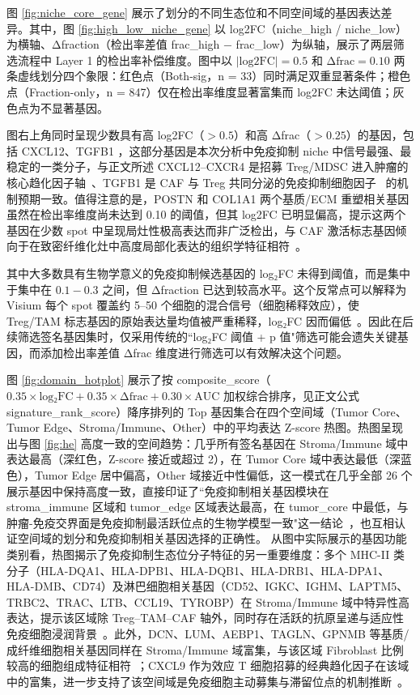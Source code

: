 \documentclass[12pt, a4paper]{ctexart}
\begin{document}
图 \ref{fig:niche_core_gene} 展示了划分的不同生态位和不同空间域的基因表达差异。其中，图 \ref{fig:high_low_niche_gene} 以 log2FC（niche\_high / niche\_low）为横轴、Δfraction（检出率差值 frac\_high − frac\_low）为纵轴，展示了两层筛选流程中 Layer 1 的检出率补偿维度。图中以 $|\text{log2FC}| = 0.5$ 和 $\text{Δfrac} = 0.10$ 两条虚线划分四个象限：红色点（Both-sig，n = 33）同时满足双重显著条件；橙色点（Fraction-only，n = 847）仅在检出率维度显著富集而 log2FC 未达阈值；灰色点为不显著基因。

图右上角同时呈现少数具有高 log2FC（$> 0.5$）和高 Δfrac（$> 0.25$）的基因，包括 CXCL12、TGFB1 ，这部分基因是本次分析中免疫抑制 niche 中信号最强、最稳定的一类分子，与正文所述 CXCL12--CXCR4 是招募 Treg/MDSC 进入肿瘤的核心趋化因子轴~\citep{domanska2013targeting}、TGFB1 是 CAF 与 Treg 共同分泌的免疫抑制细胞因子~\citep{mariathasan2018tgfb} 的机制预期一致。值得注意的是，POSTN 和 COL1A1 两个基质/ECM 重塑相关基因虽然在检出率维度尚未达到 0.10 的阈值，但其 log2FC 已明显偏高，提示这两个基因在少数 spot 中呈现局灶性极高表达而非广泛检出，与 CAF 激活标志基因倾向于在致密纤维化灶中高度局部化表达的组织学特征相符~\citep{kalluri2016biology,iozzo2015proteoglycan}。

其中大多数具有生物学意义的免疫抑制候选基因的 log₂FC 未得到阈值，而是集中于集中在 $0.1-0.3$ 之间，但 Δfraction 已达到较高水平。这个反常点可以解释为 Visium 每个 spot 覆盖约 5--50 个细胞的混合信号（细胞稀释效应），使 Treg/TAM 标志基因的原始表达量均值被严重稀释，log₂FC 因而偏低~\citep{luecken2019current}。因此在后续筛选签名基因集时，仅采用传统的``log₂FC 阈值 + p 值"筛选可能会遗失关键基因，而添加检出率差值 Δfrac 维度进行筛选可以有效解决这个问题。

图 \ref{fig:domain_hotplot} 展示了按 composite\_score（$0.35 \times \text{log₂FC} + 0.35 \times \text{Δfrac} + 0.30 \times \text{AUC}$ 加权综合排序，见正文公式 signature\_rank\_score）降序排列的 Top 基因集合在四个空间域（Tumor Core、Tumor Edge、Stroma/Immune、Other）中的平均表达 Z-score 热图。热图呈现出与图 \ref{fig:he} 高度一致的空间趋势：几乎所有签名基因在 Stroma/Immune 域中表达最高（深红色，Z-score 接近或超过 2），在 Tumor Core 域中表达最低（深蓝色），Tumor Edge 居中偏高，Other 域接近中性偏低，这一模式在几乎全部 26 个展示基因中保持高度一致，直接印证了``免疫抑制相关基因模块在 stroma\_immune 区域和 tumor\_edge 区域表达最高，在 tumor\_core 中最低，与肿瘤-免疫交界面是免疫抑制最活跃位点的生物学模型一致"这一结论~\citep{zheng2017landscape}，也互相认证空间域的划分和免疫抑制相关基因选择的正确性。
从图中实际展示的基因功能类别看，热图揭示了免疫抑制生态位分子特征的另一重要维度：多个 MHC-II 类分子（HLA-DQA1、HLA-DPB1、HLA-DQB1、HLA-DRB1、HLA-DPA1、HLA-DMB、CD74）及淋巴细胞相关基因（CD52、IGKC、IGHM、LAPTM5、TRBC2、TRAC、LTB、CCL19、TYROBP）在 Stroma/Immune 域中特异性高表达，提示该区域除 Treg--TAM--CAF 轴外，同时存在活跃的抗原呈递与适应性免疫细胞浸润背景~\citep{neefjes2011towards,chen2017oncology}。此外，DCN、LUM、AEBP1、TAGLN、GPNMB 等基质/成纤维细胞相关基因同样在 Stroma/Immune 域富集，与该区域 Fibroblast 比例较高的细胞组成特征相符~\citep{iozzo2015proteoglycan}；CXCL9 作为效应 T 细胞招募的经典趋化因子在该域中的富集，进一步支持了该空间域是免疫细胞主动募集与滞留位点的机制推断~\citep{tokunaga2018cxcl9}。
\end{document}
